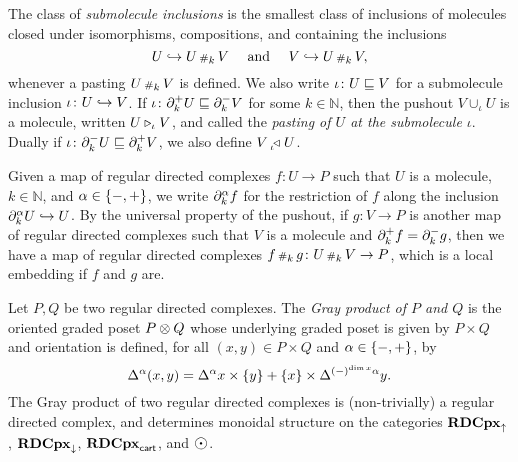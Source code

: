 The class of \emph{submolecule inclusions} is the smallest class of inclusions of molecules closed under isomorphisms, compositions, and containing the inclusions
\begin{equation*}
    U \hookrightarrow U \,{\scriptstyle\#}_{k}\, V \quad\text{ and }\quad V \hookrightarrow U \,{\scriptstyle\#}_{k}\, V,
\end{equation*}
whenever a pasting \( U \,{\scriptstyle\#}_{k}\, V \) is defined. 
We also write \( \iota \colon U \sqsubseteq V \) for a submolecule inclusion \( \iota \colon U \hookrightarrow V \).
If \( \iota \colon \partial_{k}^{+} U \sqsubseteq \partial_{k}^{-} V \) for some \( k \in \mathbb{N} \), then the pushout \( V \cup_\iota U \) is a molecule, written \( U \triangleright_{\iota} V \), and called the \emph{pasting of \( U \) at the submolecule \( \iota \)}.
Dually if \( \iota \colon \partial_{k}^{-} U \sqsubseteq \partial_{k}^{+} V \), we also define \( V \prescript{}{\iota\!}{\triangleleft}\; U \).

Given a map of regular directed complexes \( f \colon U \to P \) such that \( U \) is a molecule, \( k \in \mathbb{N} \), and \( \alpha \in \left\{ {-, +} \right\} \), we write \( \partial_{k}^{\alpha} f \) for the restriction of \( f \) along the inclusion \( \partial_{k}^{\alpha} U \hookrightarrow U \).
By the universal property of the pushout, if  \( g \colon V \to P \) is another map of regular directed complexes such that \( V \) is a molecule and \( \partial_{k}^{+} f = \partial_{k}^{-}g \), then we have a map of regular directed complexes \( f \,{\scriptstyle\#}_{k}\, g \colon U \,{\scriptstyle\#}_{k}\, V \to P \), which is a local embedding if \( f \) and \( g \) are.

Let \( P, Q \) be two regular directed complexes.
The \emph{Gray product of \( P \) and \( Q \)} is the oriented graded poset \( P \otimes Q \) whose underlying graded poset is given by \( P \times Q \) and orientation is defined, for all \( (x, y) \in P \times Q \) and \( \alpha \in \left\{ {-, +} \right\} \), by
\begin{equation*}
    \Delta_{}^{\alpha} (x, y) = \Delta_{}^{\alpha} x \times \left\{ {y} \right\} + \left\{ {x} \right\} \times \Delta_{}^{(-)^{\dim x} \alpha} y.
\end{equation*}  
The Gray product of two regular directed complexes is (non-trivially) a regular directed complex, and determines monoidal structure on the categories \( \mathbf{RDCpx}_{\uparrow} \), \( \mathbf{RDCpx}_{\downarrow} \), \( \mathbf{RDCpx}_{\mathsf{cart}} \), and \( \atom \).

